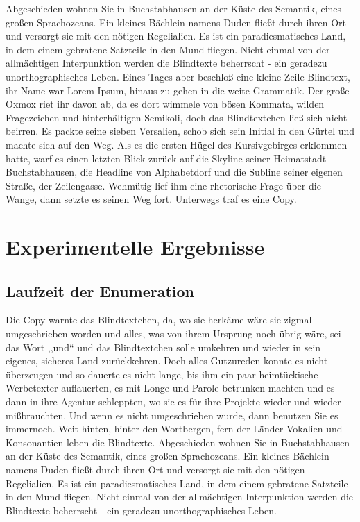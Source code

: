 \documentclass[12pt,a4paper,twoside]{scrartcl}
\numberwithin{equation}{section}
\begin{document}
Abgeschieden wohnen Sie in Buchstabhausen an der Küste des Semantik, eines großen Sprachozeans. Ein kleines Bächlein namens Duden fließt durch ihren Ort und versorgt sie mit den nötigen Regelialien. Es ist ein paradiesmatisches Land, in dem einem gebratene Satzteile in den Mund fliegen. Nicht einmal von der allmächtigen Interpunktion werden die Blindtexte beherrscht - ein geradezu unorthographisches Leben. Eines Tages aber beschloß eine kleine Zeile Blindtext, ihr Name war Lorem Ipsum, hinaus zu gehen in die weite Grammatik. Der große Oxmox riet ihr davon ab, da es dort wimmele von bösen Kommata, wilden Fragezeichen und hinterhältigen Semikoli, doch das Blindtextchen ließ sich nicht beirren. Es packte seine sieben Versalien, schob sich sein Initial in den Gürtel und machte sich auf den Weg. Als es die ersten Hügel des Kursivgebirges erklommen hatte, warf es einen letzten Blick zurück auf die Skyline seiner Heimatstadt Buchstabhausen, die Headline von Alphabetdorf und die Subline seiner eigenen Straße, der Zeilengasse. Wehmütig lief ihm eine rhetorische Frage über die Wange, dann setzte es seinen Weg fort. Unterwegs traf es eine Copy.


\section{Experimentelle Ergebnisse}

\subsection{Laufzeit der Enumeration}

Die Copy warnte das Blindtextchen, da, wo sie herkäme wäre sie zigmal umgeschrieben worden und alles, was von ihrem Ursprung noch übrig wäre, sei das Wort ,,und`` und das Blindtextchen solle umkehren und wieder in sein eigenes, sicheres Land zurückkehren. Doch alles Gutzureden konnte es nicht überzeugen und so dauerte es nicht lange, bis ihm ein paar heimtückische Werbetexter auflauerten, es mit Longe und Parole betrunken machten und es dann in ihre Agentur schleppten, wo sie es für ihre Projekte wieder und wieder mißbrauchten. Und wenn es nicht umgeschrieben wurde, dann benutzen Sie es immernoch. Weit hinten, hinter den Wortbergen, fern der Länder Vokalien und Konsonantien leben die Blindtexte. Abgeschieden wohnen Sie in Buchstabhausen an der Küste des Semantik, eines großen Sprachozeans. Ein kleines Bächlein namens Duden fließt durch ihren Ort und versorgt sie mit den nötigen Regelialien. Es ist ein paradiesmatisches Land, in dem einem gebratene Satzteile in den Mund fliegen. Nicht einmal von der allmächtigen Interpunktion werden die Blindtexte beherrscht - ein geradezu unorthographisches Leben.
\end{document}
